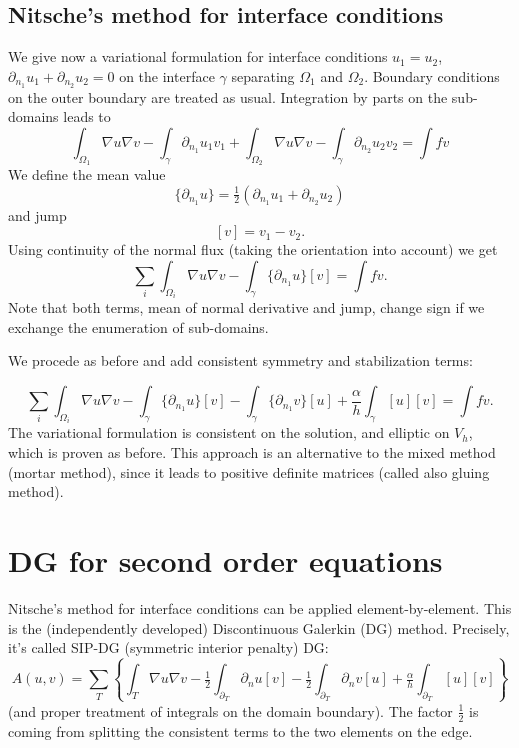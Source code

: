 \subsection{Nitsche's method for interface conditions}
We give now a variational formulation for interface conditions $u_1 =
u_2$, $\partial_{n_1} u_1 + \partial_{n_2} u_2 = 0$ on the interface
$\gamma$ separating $\Omega_1$ and $\Omega_2$. Boundary conditions on
 the outer boundary are treated as usual. Integration by parts on the
 sub-domains leads to
$$
\int_{\Omega_1} \nabla u \nabla v - \int_\gamma \partial_{n_1} u_1 v_1  + 
\int_{\Omega_2} \nabla u \nabla v - \int_\gamma \partial_{n_2} u_2 v_2 =
\int f v
$$
We define the mean value
$$
\{ \partial_{n_1} u \} = \tfrac{1}{2} ( \partial_{n_1} u_1
+ \partial_{n_2} u_2 )
$$
and jump 
$$
[v] = v_1 - v_2.
$$
Using continuity of the normal flux (taking the orientation into
account) we get
$$
\sum_i \int_{\Omega_i} \nabla u \nabla v - \int_{\gamma}
\{ \partial_{n_1} u \}  [v] = 
\int f v.  
$$ 
Note that both terms, mean of normal derivative and jump, change sign
if we exchange the enumeration of sub-domains.

We procede as before and add consistent symmetry and stabilization
terms:

$$
\sum_i \int_{\Omega_i} \nabla u \nabla v - 
\int_{\gamma} \{ \partial_{n_1} u \}  [v] -
\int_{\gamma} \{ \partial_{n_1} v \}  [u] +
\frac{\alpha}{h} \int_{\gamma} [u ] [v] =
\int f v. 
$$
The variational formulation  is consistent on the solution, and
elliptic on  $V_h$, which is proven as before. This approach is an alternative to the
mixed method (mortar method), since it leads to positive definite
matrices (called also gluing method). 

\section{DG for second order equations}
Nitsche's method for interface conditions can be applied
element-by-element. This is the (independently developed)
Discontinuous Galerkin (DG) method. Precisely, it's called SIP-DG
(symmetric interior penalty)  DG:
$$
A(u,v) = \sum_T \left\{ \int_T \nabla u \nabla v
  - \tfrac{1}{2} \int_{\partial_T} \partial_n u [v]  
- \tfrac{1}{2} \int_{\partial_T} \partial_n v [u] 
  +  \tfrac{\alpha}{h} \int_{\partial_T} [u] [v] \right\}
$$
(and proper treatment of integrals on the domain boundary). The
factor $\tfrac{1}{2}$ is coming from splitting the consistent terms to
the two elements on the edge.


